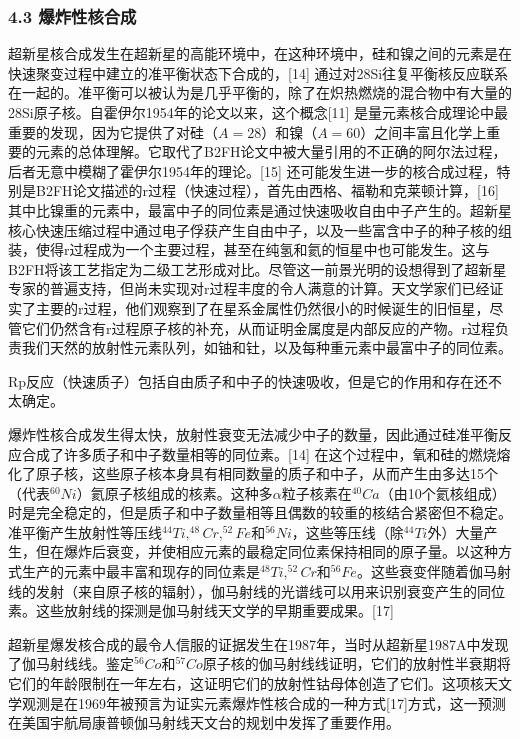 \subsubsection{4.3 爆炸性核合成}
超新星核合成发生在超新星的高能环境中，在这种环境中，硅和镍之间的元素是在快速聚变过程中建立的准平衡状态下合成的，[14] 通过对28Si往复平衡核反应联系在一起的。准平衡可以被认为是几乎平衡的，除了在炽热燃烧的混合物中有大量的28Si原子核。自霍伊尔1954年的论文以来，这个概念[11] 是量元素核合成理论中最重要的发现，因为它提供了对硅（$A=28$）和镍（$A=60$）之间丰富且化学上重要的元素的总体理解。它取代了B2FH论文中被大量引用的不正确的阿尔法过程，后者无意中模糊了霍伊尔1954年的理论。[15] 还可能发生进一步的核合成过程，特别是B2FH论文描述的r过程（快速过程），首先由西格、福勒和克莱顿计算，[16] 其中比镍重的元素中，最富中子的同位素是通过快速吸收自由中子产生的。超新星核心快速压缩过程中通过电子俘获产生自由中子，以及一些富含中子的种子核的组装，使得r过程成为一个主要过程，甚至在纯氢和氦的恒星中也可能发生。这与B2FH将该工艺指定为二级工艺形成对比。尽管这一前景光明的设想得到了超新星专家的普遍支持，但尚未实现对r过程丰度的令人满意的计算。天文学家们已经证实了主要的r过程，他们观察到了在星系金属性仍然很小的时候诞生的旧恒星，尽管它们仍然含有r过程原子核的补充，从而证明金属度是内部反应的产物。r过程负责我们天然的放射性元素队列，如铀和钍，以及每种重元素中最富中子的同位素。

Rp反应（快速质子）包括自由质子和中子的快速吸收，但是它的作用和存在还不太确定。

爆炸性核合成发生得太快，放射性衰变无法减少中子的数量，因此通过硅准平衡反应合成了许多质子和中子数量相等的同位素。[14] 在这个过程中，氧和硅的燃烧熔化了原子核，这些原子核本身具有相同数量的质子和中子，从而产生由多达15个（代表$^{60}Ni$）氦原子核组成的核素。这种多$\alpha$粒子核素在$^{40}Ca$（由10个氦核组成）时是完全稳定的，但是质子和中子数量相等且偶数的较重的核结合紧密但不稳定。准平衡产生放射性等压线$^{44}Ti,^{48}Cr,^{52}Fe$和$^{56}Ni$，这些等压线（除$^{44}Ti$外）大量产生，但在爆炸后衰变，并使相应元素的最稳定同位素保持相同的原子量。以这种方式生产的元素中最丰富和现存的同位素是$^{48}Ti,^{52}Cr$和$^{56}Fe$。这些衰变伴随着伽马射线的发射（来自原子核的辐射），伽马射线的光谱线可以用来识别衰变产生的同位素。这些放射线的探测是伽马射线天文学的早期重要成果。[17]

超新星爆发核合成的最令人信服的证据发生在1987年，当时从超新星1987A中发现了伽马射线线。鉴定$^{56}Co$和$^{57}Co$原子核的伽马射线线证明，它们的放射性半衰期将它们的年龄限制在一年左右，这证明它们的放射性钴母体创造了它们。这项核天文学观测是在1969年被预言为证实元素爆炸性核合成的一种方式[17]方式，这一预测在美国宇航局康普顿伽马射线天文台的规划中发挥了重要作用。

